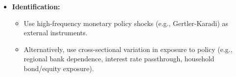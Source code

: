 \documentclass[10pt]{article}
\begin{document}
\begin{itemize}
\begin{itemize}
\item \textbf{Identification:}
\begin{itemize}
    \item Use high-frequency monetary policy shocks (e.g., Gertler-Karadi) as external instruments.
    \item Alternatively, use cross-sectional variation in exposure to policy (e.g., regional bank dependence, interest rate passthrough, household bond/equity exposure).
\end{itemize}


\end{itemize}
\end{itemize}
\end{document}
